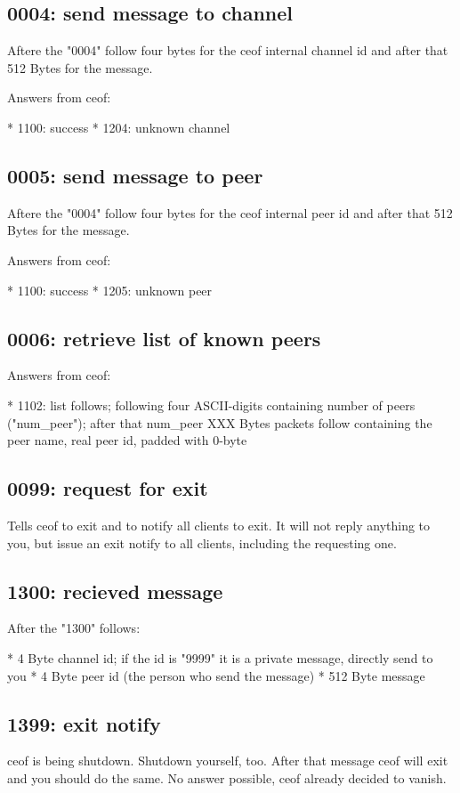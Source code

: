 \documentclass[12pt,a4paper]{article}
\begin{document}
\subsection{0004: send message to channel}

Aftere the "0004" follow four bytes for the ceof internal channel id and after that 512 Bytes for the message.

Answers from ceof:

    * 1100: success
    * 1204: unknown channel


\subsection{0005: send message to peer}

Aftere the "0004" follow four bytes for the ceof internal peer id and after that 512 Bytes for the message.

Answers from ceof:

    * 1100: success
    * 1205: unknown peer


\subsection{0006: retrieve list of known peers}

Answers from ceof:

    * 1102: list follows; following four ASCII-digits containing number of peers ("num_peer"); after that  num_peer  XXX Bytes packets follow containing the peer name, real peer id, padded with 0-byte

\subsection{0099: request for exit}

Tells ceof to exit and to notify all clients to exit. It will not reply anything to you, but issue an exit notify to all clients, including the requesting one.


\subsection{1300: recieved message}

After the "1300" follows:

    * 4 Byte channel id; if the id is "9999" it is a private message, directly send to you
    * 4 Byte peer id (the person who send the message)
    * 512 Byte message


\subsection{1399: exit notify}

ceof is being shutdown. Shutdown yourself, too. After that message ceof will exit and you should do the same. No answer possible, ceof already decided to vanish.
\end{document}
